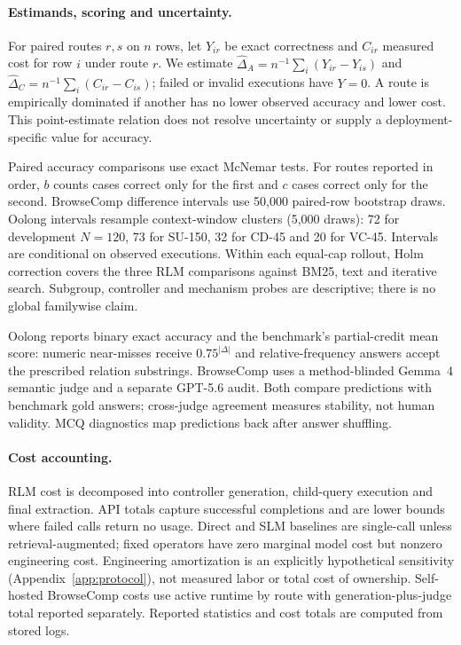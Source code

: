 \documentclass{article}
\begin{document}
\paragraph{Estimands, scoring and uncertainty.}
For paired routes $r,s$ on $n$ rows, let $Y_{ir}$ be exact correctness and $C_{ir}$ measured cost for row $i$ under route $r$. We estimate $\widehat{\Delta}_A=n^{-1}\sum_i(Y_{ir}-Y_{is})$ and $\widehat{\Delta}_C=n^{-1}\sum_i(C_{ir}-C_{is})$; failed or invalid executions have $Y=0$. A route is empirically dominated if another has no lower observed accuracy and lower cost. This point-estimate relation does not resolve uncertainty or supply a deployment-specific value for accuracy.

Paired accuracy comparisons use exact McNemar tests. For routes reported in order, $b$ counts cases correct only for the first and $c$ cases correct only for the second. BrowseComp difference intervals use 50,000 paired-row bootstrap draws. Oolong intervals resample context-window clusters (5,000 draws): 72 for development $N{=}120$, 73 for SU-150, 32 for CD-45 and 20 for VC-45. Intervals are conditional on observed executions. Within each equal-cap rollout, Holm correction covers the three RLM comparisons against BM25, text and iterative search. Subgroup, controller and mechanism probes are descriptive; there is no global familywise claim.

Oolong reports binary exact accuracy and the benchmark's partial-credit mean score: numeric near-misses receive $0.75^{|\Delta|}$ and relative-frequency answers accept the prescribed relation substrings. BrowseComp uses a method-blinded Gemma~4 semantic judge and a separate GPT-5.6 audit. Both compare predictions with benchmark gold answers; cross-judge agreement measures stability, not human validity. MCQ diagnostics map predictions back after answer shuffling.

\paragraph{Cost accounting.}
RLM cost is decomposed into controller generation, child-query execution and final extraction. API totals capture successful completions and are lower bounds where failed calls return no usage. Direct and SLM baselines are single-call unless retrieval-augmented; fixed operators have zero marginal model cost but nonzero engineering cost. Engineering amortization is an explicitly hypothetical sensitivity (Appendix~\ref{app:protocol}), not measured labor or total cost of ownership. Self-hosted BrowseComp costs use active runtime by route with generation-plus-judge total reported separately. Reported statistics and cost totals are computed from stored logs.
\end{document}
